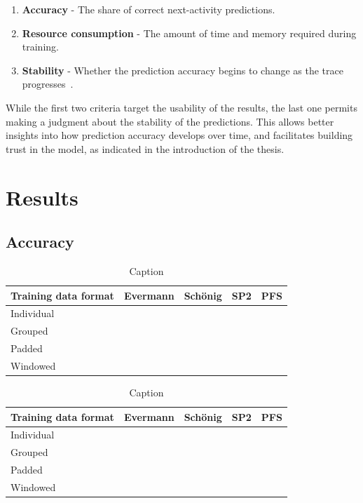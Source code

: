 \begin{enumerate}
    \item\textbf{Accuracy} - The share of correct next-activity predictions.
    \item\textbf{Resource consumption} - The amount of time and memory required during training.
    \item\textbf{Stability} - Whether the prediction accuracy begins to change as the trace progresses~\cite{francescomarino2015}.
\end{enumerate}

While the first two criteria target the usability of the results, the last one permits making a judgment about the stability of the predictions. This allows better insights into how prediction accuracy develops over time, and facilitates building trust in the model, as indicated in the introduction of the thesis.

\section{Results}\label{sec:eval:results}


\subsection*{Accuracy}
\begin{table}
\centering
\begin{tabular}{l|cccc}
    Training data format & Evermann & Schönig & SP2 & PFS\\
    \hline
    Individual &&&\\
    Grouped &&&\\
    Padded &&&\\
    Windowed &&&\\
\end{tabular}
\caption{Caption}
\label{tab:accuracy_bpic2011}
\end{table}
\begin{table}
\centering
\begin{tabular}{l|cccc}
    Training data format & Evermann & Schönig & SP2 & PFS\\
    \hline
    Individual &&&\\
    Grouped &&&\\
    Padded &&&\\
    Windowed &&&\\
\end{tabular}
\caption{Caption}
\label{tab:accuracy_bpic2017}
\end{table}

